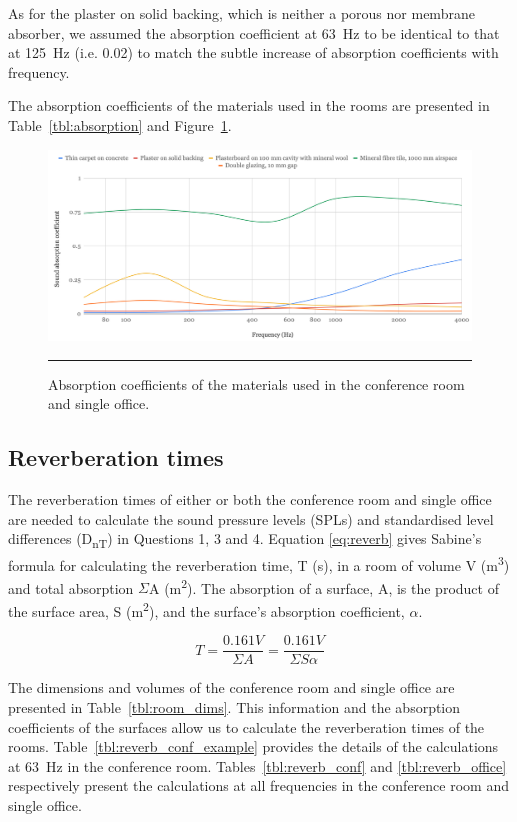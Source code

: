 As for the plaster on solid backing, which is neither a porous nor membrane absorber, we assumed the absorption coefficient at 63~Hz to be identical to that at 125~Hz (i.e. 0.02) to match the subtle increase of absorption coefficients with frequency.

The absorption coefficients of the materials used in the rooms are presented in Table~\ref{tbl:absorption} and Figure~\ref{fig:absorption_coefs}.


\begin{figure}[htbp]
	\centering
	\includegraphics[width=\textwidth]{figures/Materials_absorption.png}
	\rule{\textwidth}{0.5pt} %
	\caption{Absorption coefficients of the materials used in the conference room and single office.}
	\label{fig:absorption_coefs}
\end{figure}




\subsection{Reverberation times}

The reverberation times of either or both the conference room and single office are needed to calculate the sound pressure levels (SPLs) and standardised level differences (D\textsubscript{nT}) in Questions 1, 3 and 4.
Equation \ref{eq:reverb} gives Sabine's formula for calculating the reverberation time, T (s), in a room of volume V (m\textsuperscript{3}) and total absorption $\Sigma$A (m\textsuperscript{2}).
The absorption of a surface, A, is the product of the surface area, S (m\textsuperscript{2}), and the surface's absorption coefficient, $\alpha$.

    \begin{equation}\label{eq:reverb}
		T = \frac{0.161 V}{\Sigma A} = \frac{0.161 V}{\Sigma S \alpha}
	\end{equation}

The dimensions and volumes of the conference room and single office are presented in Table~\ref{tbl:room_dims}.
This information and the absorption coefficients of the surfaces allow us to calculate the reverberation times of the rooms.
Table~\ref{tbl:reverb_conf_example} provides the details of the calculations at 63~Hz in the conference room.
Tables~\ref{tbl:reverb_conf} and \ref{tbl:reverb_office} respectively present the calculations at all frequencies in the conference room and single office.


